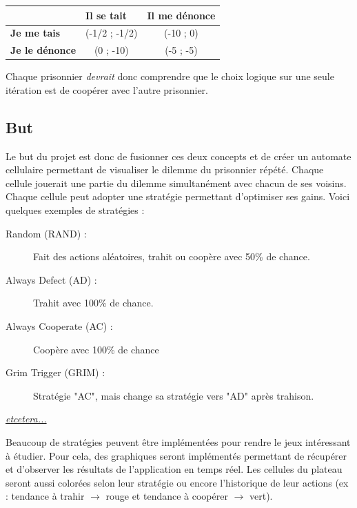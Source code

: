 \documentclass[a4paper]{article}
\begin{document}
\begin{framed}
        \begin{center}
            \begin{tabular}{|l|c|c|}
            \hline
            \textbf{} & \multicolumn{1}{l|}{\textbf{Il se tait}} & \multicolumn{1}{l|}{\textbf{Il me dénonce}} \\ \hline
            \textbf{Je me tais}         & (-1/2 ; -1/2)                            & (-10 ; 0)                                   \\ \hline
            \textbf{Je le dénonce}      & (0 ; -10)                                & (-5 ; -5)                                   \\ \hline
            \end{tabular}
        \end{center}
        
        Chaque prisonnier \textit{devrait} donc comprendre que le choix logique sur une seule itération est de coopérer avec l'autre prisonnier.
\end{framed}

\subsection{But}
Le but du projet est donc de fusionner ces deux concepts et de créer un automate cellulaire permettant de visualiser le dilemme du prisonnier répété. Chaque cellule jouerait une partie du dilemme simultanément avec chacun de ses voisins. Chaque cellule peut adopter une stratégie permettant d'optimiser ses gains. Voici quelques exemples de stratégies :
\begin{framed}
    \begin{description}
        \item[Random (RAND) : ] Fait des actions aléatoires, trahit ou coopère avec 50\% de chance.
        \item[Always Defect (AD) : ] Trahit avec 100\% de chance.
        \item[Always Cooperate (AC) : ] Coopère avec 100\% de chance
        \item[Grim Trigger (GRIM) : ] Stratégie "AC", mais change sa stratégie vers "AD" après trahison.
        \item[\href{http://www.iterated-prisoners-dilemma.net/prisoners-dilemma-strategies.shtml}{\textit{etcetera...}}] \cite{StratIPD}
    \end{description}
\end{framed}

Beaucoup de stratégies peuvent être implémentées pour rendre le jeux intéressant à étudier. Pour cela, des graphiques seront implémentés permettant de récupérer et d'observer les résultats de l'application en temps réel. Les cellules du plateau seront aussi colorées selon leur stratégie ou encore l'historique de leur actions (ex : tendance à trahir $\rightarrow{}$ rouge et tendance à coopérer $\rightarrow{}$ vert).
\end{document}
